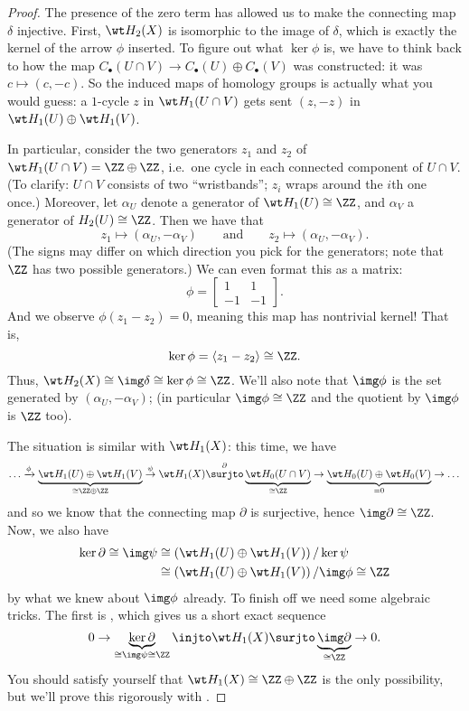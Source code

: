 \begin{proof}
	The presence of the zero term has allowed us to make the connecting map $\delta$ injective.
	First, $\wt H_2(X)$ is isomorphic to the image of $\delta$, which is
	exactly the kernel of the arrow $\phi$ inserted.
	To figure out what $\ker \phi$ is, we have to think back to how the map
	$C_\bullet(U \cap V) \to C_\bullet(U) \oplus C_\bullet(V)$ was constructed:
	it was $c \mapsto (c, -c)$.
	So the induced maps of homology groups is actually what you would guess:
	a $1$-cycle $z$ in $\wt H_1(U \cap V)$ gets sent $(z, -z)$ in $\wt H_1(U) \oplus \wt H_1(V)$.

	In particular, consider the two generators $z_1$ and $z_2$ of
	$\wt H_1(U \cap V) = \ZZ \oplus \ZZ$,
	i.e.\ one cycle in each connected component of $U \cap V$.
	(To clarify: $U \cap V$ consists of two ``wristbands'';
	$z_i$ wraps around the $i$th one once.)
	Moreover, let $\alpha_U$ denote a generator of $\wt H_1(U) \cong \ZZ$,
	and $\alpha_V$ a generator of $H_2(U) \cong \ZZ$.
	Then we have that
	\[ z_1 \mapsto (\alpha_U, -\alpha_V) \qquad\text{and}\qquad z_2 \mapsto (\alpha_U, -\alpha_V). \]
	(The signs may differ on which direction you pick for the generators;
	note that $\ZZ$ has two possible generators.)
	We can even format this as a matrix:
	\[ \phi = \begin{bmatrix} 1 & 1 \\ -1 & -1 \end{bmatrix}. \]
	And we observe $\phi(z_1 - z_2) = 0$, meaning this map has nontrivial kernel!
	That is, \[ \ker\phi = \left< z_1 - z_2 \right> \cong \ZZ. \]
	Thus, $\wt H_2(X) \cong \img \delta \cong \ker \phi \cong \ZZ$.
	We'll also note that $\img \phi$ is the set generated by $(\alpha_U, -\alpha_V)$;
	(in particular $\img\phi \cong \ZZ$ and the quotient by $\img\phi$ is $\ZZ$ too).

	The situation is similar with $\wt H_1(X)$: this time, we have
	\[
		\dots
		\xrightarrow{\phi} \underbrace{\wt H_1(U) \oplus \wt H_1(V)}_{\cong \ZZ \oplus \ZZ}
		\overset{\psi}{\to} \wt H_1(X) \overset\partial\surjto
		\underbrace{\wt H_0(U \cap V)}_{\cong \ZZ}
		\to \underbrace{\wt H_0(U) \oplus \wt H_0(V)}_{=0} \to \dots
	\]
	and so we know that the connecting map $\partial$ is surjective,
	hence $\img \partial \cong \ZZ$.
	Now, we also have
	\begin{align*}
		\ker \partial \cong \img \psi &\cong \left( \wt H_1(U) \oplus \wt H_1(V) \right) / \ker \psi \\
		&\cong \left( \wt H_1(U) \oplus \wt H_1(V) \right) / \img \phi
		\cong \ZZ
	\end{align*}
	by what we knew about $\img \phi$ already.
	To finish off we need some algebraic tricks. The first is ,
	which gives us a short exact sequence
	\[
		0 \to \underbrace{\ker\partial}_{\cong \img\psi \cong \ZZ}
		\injto \wt H_1(X)
		\surjto \underbrace{\img\partial}_{\cong \ZZ} \to 0.
	\]
	You should satisfy yourself that $\wt H_1(X) \cong \ZZ \oplus \ZZ$ is the
	only possibility, but we'll prove this rigorously with .
\end{proof}

